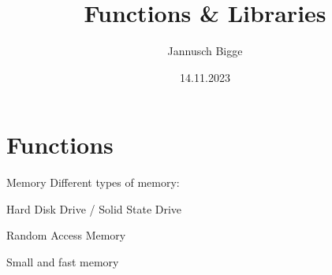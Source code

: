 \documentclass{beamer}
\title{Functions \& Libraries}
\author{Jannusch Bigge}
\date{14.11.2023}
\begin{document}
\begin{frame}
    \titlepage
\end{frame}

\section{Functions}

\begin{frame}{Memory}
    Different types of memory:
   \begin{description}
        \item<1->[HDD/SSD] Hard Disk Drive / Solid State Drive  
        \item<2->[RAM] Random Access Memory
        \item<3->[Cache] Small and fast memory
   \end{description}
\end{frame}


\end{document}
